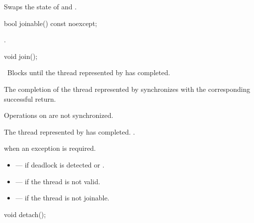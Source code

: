 \begin{itemdescr}
\pnum
\effects Swaps the state of  and .
\end{itemdescr}

%
\begin{itemdecl}
bool joinable() const noexcept;
\end{itemdecl}

\begin{itemdescr}
\pnum
\returns {}.
\end{itemdescr}

%
\begin{itemdecl}
void join();
\end{itemdecl}

\begin{itemdescr}
\pnum
\effects\ Blocks until the thread represented by  has completed.

\pnum
\sync The completion of the thread represented by  synchronizes with
the corresponding successful
 return. \begin{note} Operations on
 are not synchronized. \end{note}

\pnum
\ensures The thread represented by  has completed. .

\pnum
\throws {} when
an exception is required.

\pnum
\errors
\begin{itemize}
\item {} --- if deadlock is detected or
.

\item {} --- if the thread is not valid.

\item {} --- if the thread is not joinable.
\end{itemize}
\end{itemdescr}

%
\begin{itemdecl}
void detach();
\end{itemdecl}

